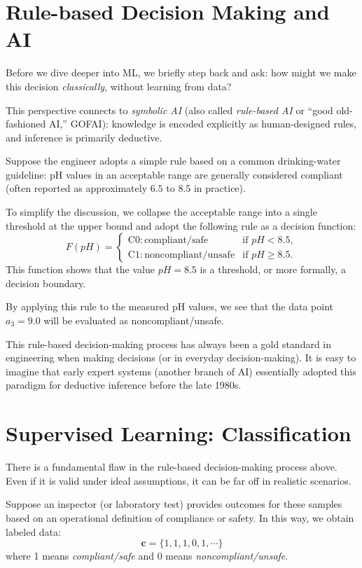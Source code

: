 \documentclass[12pt]{article}
\begin{document}
\section{Rule-based Decision Making and AI}
Before we dive deeper into ML, we briefly step back and ask: how might we make this decision \emph{classically}, without learning from data?

This perspective connects to \emph{symbolic AI} (also called \emph{rule-based AI} or ``good old-fashioned AI,'' GOFAI): knowledge is encoded explicitly as human-designed rules, and inference is primarily deductive.

Suppose the engineer adopts a simple rule based on a common drinking-water guideline: pH values in an acceptable range are generally considered compliant (often reported as approximately \(6.5\) to \(8.5\) in practice).

To simplify the discussion, we collapse the acceptable range into a single threshold at the upper bound and adopt the following rule as a decision function:
\[
  F(pH) = \left\{ 
    \begin{array}{ll}
      \mathrm{C0: compliant/safe} & \text{if } pH < 8.5, \\
      \mathrm{C1: noncompliant/unsafe} & \text{if } pH \geq 8.5.
    \end{array}
\right.
\]
This function shows that the value \(pH = 8.5\) is a threshold, or more formally, a decision boundary.

By applying this rule to the measured pH values, we see that the data point \(a_3 = 9.0\) will be evaluated as noncompliant/unsafe.

This rule-based decision-making process has always been a gold standard in engineering when making decisions (or in everyday decision-making). It is easy to imagine that early expert systems (another branch of AI) essentially adopted this paradigm for deductive inference before the late 1980s. 

\section{Supervised Learning: Classification}
There is a fundamental flaw in the rule-based decision-making process above. Even if it is valid under ideal assumptions, it can be far off in realistic scenarios.

Suppose an inspector (or laboratory test) provides outcomes for these samples based on an operational definition of compliance or safety. In this way, we obtain labeled data:
\[
\bm{c} = \{1, 1, 1, 0, 1, \cdots \}
\]
where 1 means \textit{compliant/safe} and 0 means \textit{noncompliant/unsafe}.
\end{document}
